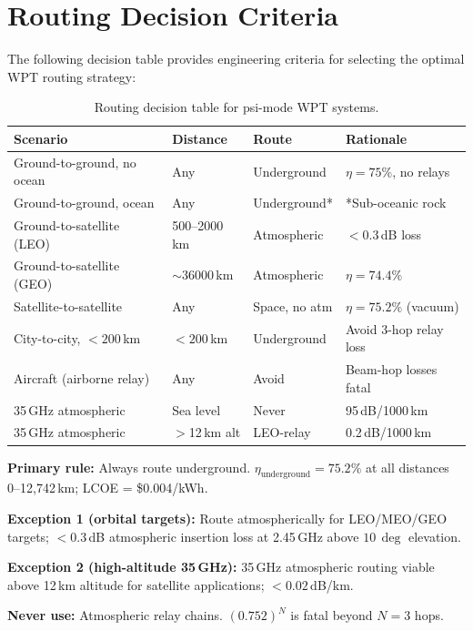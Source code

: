 \documentclass[aps,prd,twocolumn,superscriptaddress]{revtex4-2}
\begin{document}
\section{Routing Decision Criteria}
\label{sec:routing_decision}

The following decision table provides engineering criteria for
selecting the optimal WPT routing strategy:

\begin{table}[H]
\centering
\caption{Routing decision table for psi-mode WPT systems.}
\label{tab:routing}
\begin{tabular}{p{3.5cm}p{2cm}p{3cm}l}
\toprule
Scenario & Distance & Route & Rationale \\
\midrule
Ground-to-ground, no ocean & Any & Underground & $\eta=75\%$, no relays \\
Ground-to-ground, ocean & Any & Underground* & *Sub-oceanic rock \\
Ground-to-satellite (LEO) & 500--2000\,km & Atmospheric & $<0.3$\,dB loss \\
Ground-to-satellite (GEO) & $\sim$36000\,km & Atmospheric & $\eta=74.4\%$ \\
Satellite-to-satellite & Any & Space, no atm & $\eta=75.2\%$ (vacuum) \\
City-to-city, $<200$\,km & $<200$\,km & Underground & Avoid 3-hop relay loss \\
Aircraft (airborne relay) & Any & Avoid & Beam-hop losses fatal \\
35\,GHz atmospheric & Sea level & Never & 95\,dB/1000\,km \\
35\,GHz atmospheric & $>$12\,km alt & LEO-relay & 0.2\,dB/1000\,km \\
\bottomrule
\end{tabular}
\end{table}

\begin{tcolorbox}[colback=blue!5!white,colframe=blue!75!black,
  title={W3i4 P4 Routing Rule}]
\textbf{Primary rule:} Always route underground.
$\eta_\mathrm{underground} = 75.2\%$ at all distances 0--12,742\,km;
LCOE = \$0.004/kWh.

\textbf{Exception 1 (orbital targets):} Route atmospherically
for LEO/MEO/GEO targets; $<0.3$\,dB atmospheric insertion loss
at 2.45\,GHz above $10\,\deg$ elevation.

\textbf{Exception 2 (high-altitude 35\,GHz):} 35\,GHz
atmospheric routing viable above 12\,km altitude for satellite
applications; $<0.02$\,dB/km.

\textbf{Never use:} Atmospheric relay chains.
$(0.752)^N$ is fatal beyond $N=3$ hops.
\end{tcolorbox}
\end{document}
